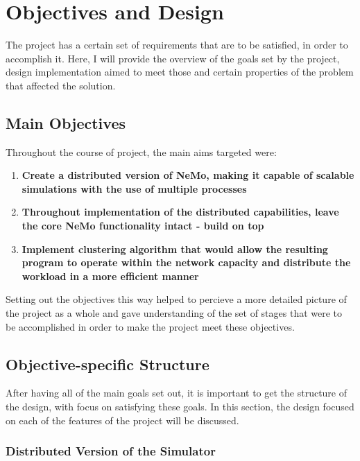 \chapter{Objectives and Design}

The project has a certain set of requirements that are to be satisfied, in order to accomplish it.
Here, I will provide the overview of the goals set by the project, design implementation aimed to meet those and certain properties of the problem that affected the solution.

\section{Main Objectives}

Throughout the course of project, the main aims targeted were:

\begin{enumerate}
\item {\textbf{Create a distributed version of NeMo, making it capable of scalable simulations with the use of multiple processes}}
\item {\textbf{Throughout implementation of the distributed capabilities, leave the core NeMo functionality intact - build on top}}
\item {\textbf{Implement clustering algorithm that would allow the resulting program to operate within the network capacity and distribute the workload in a more efficient manner}}
\end{enumerate}

Setting out the objectives this way helped to percieve a more detailed picture of the project as a whole and gave understanding of the set of stages that were to be accomplished in order to
make the project meet these objectives.

\section{Objective-specific Structure}

After having all of the main goals set out, it is important to get the structure of the design, with focus on satisfying these goals. In this section, the design focused on each of the features of the project will be discussed.

\subsection{Distributed Version of the Simulator}

